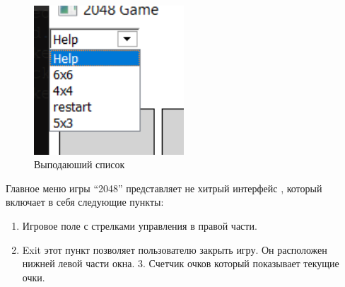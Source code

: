 \begin{figure}[ht]
    \centering
    \includegraphics[width=0.5\textwidth]{images/2.png}
    \caption{Выподаюший список}
    \label{fig:enter-label}
\end{figure}
Главное меню игры “2048” представляет не хитрый интерфейс , который включает в себя следующие пункты:
\begin{enumerate}
\item Игровое поле с стрелками управления в правой части.
\item Exit этот пункт позволяет пользователю закрыть игру. Он расположен нижней левой  части окна.
3.  Счетчик очков который показывает текущие очки.
\end{enumerate}

